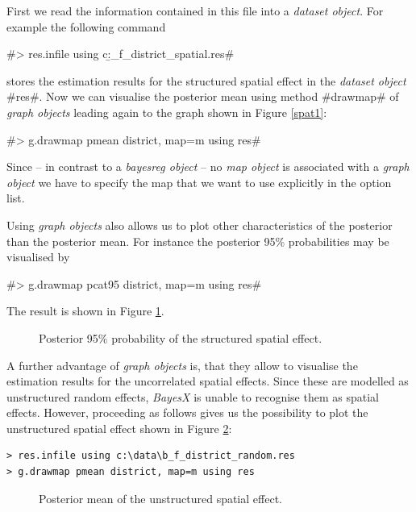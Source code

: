 \documentclass{article}
\begin{document}
First we read the information contained in this file into a {\it
dataset object}. For example the following command

#> res.infile using c:\data\b_f_district_spatial.res#

stores the estimation results for the structured spatial effect in
the {\em dataset object} #res#. Now we can visualise the posterior
mean using method #drawmap# of {\it graph objects} leading again
to the graph shown in Figure \ref{spat1}:

#> g.drawmap pmean district, map=m using res#

Since -- in contrast to a {\it bayesreg object} -- no {\it map
object} is associated with a {\it graph object} we have to specify
the map that we want to use explicitly in the option list.

Using {\it graph objects} also allows us to plot other
characteristics of the posterior than the posterior mean. For
instance the posterior 95\% probabilities may be visualised by

#> g.drawmap pcat95 district, map=m using res#

The result is shown in Figure \ref{spat2}.

\begin{figure}[ht]
\begin{center}
{\it\caption{Posterior 95\% probability of the structured spatial
effect.\label{spat2}}}
\end{center}
\end{figure}

A further advantage of {\it graph objects} is, that they allow to
visualise the estimation results for the uncorrelated spatial
effects. Since these are modelled as unstructured random effects,
{\it BayesX} is unable to recognise them as spatial effects.
However, proceeding as follows gives us the possibility to plot
the unstructured spatial effect shown in Figure \ref{random1}:

\begin{verbatim}
> res.infile using c:\data\b_f_district_random.res
> g.drawmap pmean district, map=m using res
\end{verbatim}

\begin{figure}[ht]
\begin{center}
{\it\caption{Posterior mean of the unstructured spatial
effect.\label{random1}}}
\end{center}
\end{figure}
\end{document}
